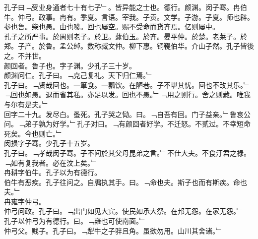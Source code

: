 \documentclass{zhvt-classic}
\begin{document}

\hspace*{2em}孔子曰﹁受业身通者七十有七子﹂。皆异能之士也。德行。颜渊。闵子骞。冉伯牛。仲弓。政事。冉有。季夏。言语。宰我。子贡。文学。子游。子夏。师也辟。参也鲁。柴也愚。由也喭。回也屡空。赐不受命而货齐焉。亿则屡中。\\
\hspace*{2em}孔子之所严事。於周则老子。於卫。蘧伯玉。於齐。晏平仲。於楚。老莱子。於郑。子产。於鲁。孟公绰。数称臧文仲。柳下惠。铜鞮伯华。介山子然。孔子皆後之。不并世。\\
\hspace*{2em}颜回者。鲁子也。字子渊。少孔子三十岁。\\
\hspace*{2em}颜渊问仁。孔子曰。﹁克己复礼。天下归仁焉。﹂\\
\hspace*{2em}孔子曰。﹁贤哉回也。一箪食。一瓢饮。在陋巷。子不堪其忧。回也不改其乐。﹂﹁回也如愚。退而省其私。亦足以发。回也不愚。﹂﹁用之则行。舍之则藏。唯我与尔有是夫。﹂\\
\hspace*{2em}回字二十九。发尽白。蚤死。孔子哭之恸。曰。﹁自吾有回。门子益亲。﹂鲁哀公问。﹁弟子孰为好学。﹂孔子对曰。﹁有颜回者好学。不迁怒。不贰过。不幸短命死矣。今也则亡。﹂\\
\hspace*{2em}闵损字子骞。少孔子十五岁。\\
\hspace*{2em}孔子曰。﹁孝哉闵子骞。子不间於其父母昆弟之言。﹂不仕大夫。不食汙君之禄。﹁如有复我者。必在汶上矣。﹂\\
\hspace*{2em}冉耕字伯牛。孔子以为有德行。\\
\hspace*{2em}伯牛有恶疾。孔子往问之。自牖执其手。曰。﹁命也夫。斯子也而有斯疾。命也夫。﹂\\
\hspace*{2em}冉雍字仲弓。\\
\hspace*{2em}仲弓问政。孔子曰。﹁出门如见大宾。使民如承大祭。在邦无怨。在家无怨。﹂\\
\hspace*{2em}孔子以仲弓为有德行。曰。﹁雍也可使南面。﹂\\
\hspace*{2em}仲弓父。贱子。孔子曰。﹁犁牛之子骍且角。虽欲勿用。山川其舍诸。﹂\\
\end{document}
